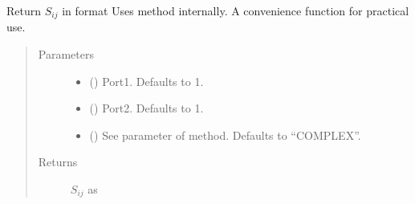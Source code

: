 \documentclass[letterpaper,10pt,english]{sphinxmanual}
\begin{document}
\begin{fulllineitems}
\begin{fulllineitems}
\begin{quote}
\begin{description}
\end{description}\end{quote}

\end{fulllineitems}


\begin{fulllineitems}
\label{\detokenize{touchstone:touchstone.spfile.S}}
Return \(S_{i j}\) in format 
Uses  method internally. A convenience function for practical use.
\begin{quote}\begin{description}
\item[{Parameters}] \leavevmode\begin{itemize}
\item {} 
 (\sphinxstyleliteralemphasis{\sphinxupquote{, }}) \textendash{} Port\sphinxhyphen{}1. Defaults to 1.

\item {} 
 (\sphinxstyleliteralemphasis{\sphinxupquote{, }}) \textendash{} Port\sphinxhyphen{}2. Defaults to 1.

\item {} 
 (\sphinxstyleliteralemphasis{\sphinxupquote{, }}) \textendash{} See  parameter of  method. Defaults to “COMPLEX”.

\end{itemize}

\item[{Returns}] \leavevmode
\(S_{i j}\) as 


\end{description}
\end{quote}
\end{fulllineitems}
\end{fulllineitems}
\end{document}
